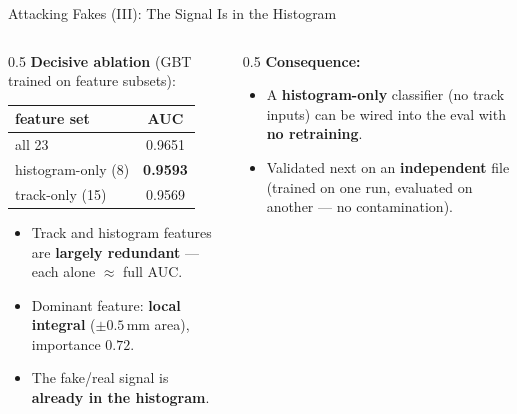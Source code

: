 \documentclass[xcolor=table,aspectratio=169]{beamer}
\begin{document}
\begin{frame}{Attacking Fakes (III): The Signal Is in the Histogram}
    \begin{columns}[c]
        \begin{column}{0.5\linewidth}
            \small
            \textbf{Decisive ablation} (GBT trained on feature subsets):
            \vspace{0.3em}
            \begin{tabular}{lc}
                \hline
                \textbf{feature set} & \textbf{AUC} \\
                \hline
                all 23                & 0.9651 \\
                histogram-only (8)    & \textbf{0.9593} \\
                track-only (15)       & 0.9569 \\
                \hline
            \end{tabular}
            \vspace{0.5em}
            \begin{itemize}\setlength\itemsep{0.25em}
                \item Track and histogram features are \textbf{largely redundant}
                --- each alone $\approx$ full AUC.
                \item Dominant feature: \textbf{local integral} ($\pm0.5$\,mm area),
                importance $0.72$.
                \item The fake/real signal is \textbf{already in the histogram}.
            \end{itemize}
        \end{column}
        \begin{column}{0.5\linewidth}
            \small
            \textbf{Consequence:}
            \begin{itemize}\setlength\itemsep{0.3em}
                \item A \textbf{histogram-only} classifier (no track inputs) can be
                wired into the eval with \textbf{no retraining}.
                \item Validated next on an \textbf{independent} file (trained on one
                run, evaluated on another --- no contamination).
            \end{itemize}
            \vspace{0.5em}
        \end{column}
    \end{columns}
\end{frame}
\end{document}
